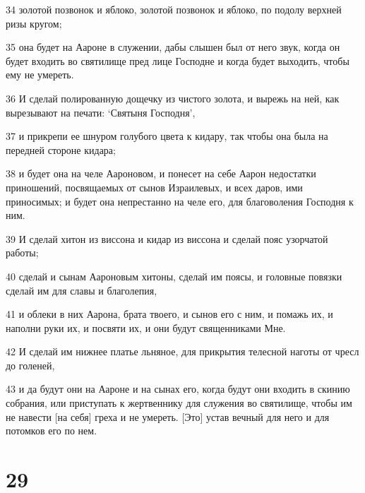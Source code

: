 \par 34 золотой позвонок и яблоко, золотой позвонок и яблоко, по подолу верхней ризы кругом;
\par 35 она будет на Аароне в служении, дабы слышен был от него звук, когда он будет входить во святилище пред лице Господне и когда будет выходить, чтобы ему не умереть.
\par 36 И сделай полированную дощечку из чистого золота, и вырежь на ней, как вырезывают на печати: `Святыня Господня',
\par 37 и прикрепи ее шнуром голубого цвета к кидару, так чтобы она была на передней стороне кидара;
\par 38 и будет она на челе Аароновом, и понесет на себе Аарон недостатки приношений, посвящаемых от сынов Израилевых, и всех даров, ими приносимых; и будет она непрестанно на челе его, для благоволения Господня к ним.
\par 39 И сделай хитон из виссона и кидар из виссона и сделай пояс узорчатой работы;
\par 40 сделай и сынам Аароновым хитоны, сделай им поясы, и головные повязки сделай им для славы и благолепия,
\par 41 и облеки в них Аарона, брата твоего, и сынов его с ним, и помажь их, и наполни руки их, и посвяти их, и они будут священниками Мне.
\par 42 И сделай им нижнее платье льняное, для прикрытия телесной наготы от чресл до голеней,
\par 43 и да будут они на Аароне и на сынах его, когда будут они входить в скинию собрания, или приступать к жертвеннику для служения во святилище, чтобы им не навести [на себя] греха и не умереть. [Это] устав вечный для него и для потомков его по нем.

\chapter{29}

